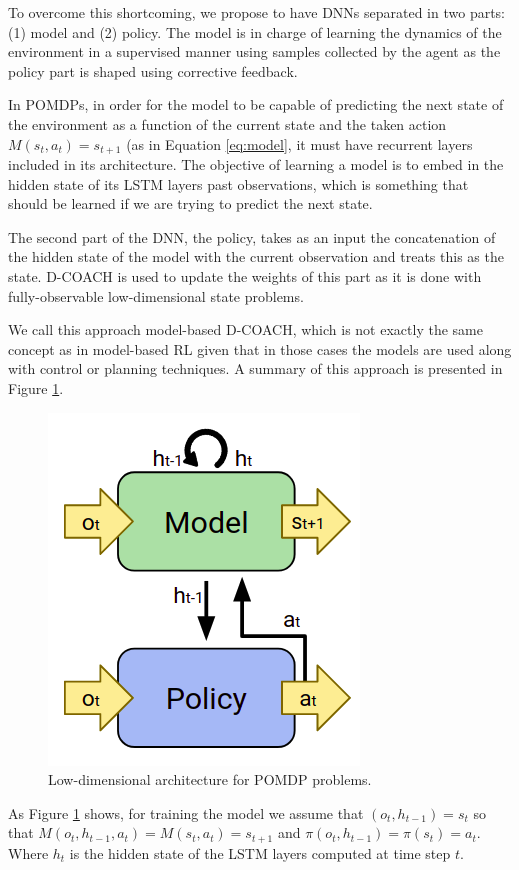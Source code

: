 To overcome this shortcoming, we propose to have DNNs separated in two parts: (1) model and (2) policy. The model is in charge of learning the dynamics of the environment in a supervised manner using samples collected by the agent as the policy part is shaped using corrective feedback. 

In POMDPs, in order for the model to be capable of predicting the next state of the environment as a function of the current state and the taken action $M(s_{t},a_{t}) = s_{t+1}$ (as in Equation \ref{eq:model}, it must have recurrent layers included in its architecture. The objective of learning a model is to embed in the hidden state of its LSTM layers past observations, which is something that should be learned if we are trying to predict the next state. 

The second part of the DNN, the policy, takes as an input the concatenation of the hidden state of the model with the current observation and treats this as the state. D-COACH is used to update the weights of this part as it is done with fully-observable low-dimensional state problems.

We call this approach model-based D-COACH, which is not exactly the same concept as in model-based RL given that in those cases the models are used along with control or planning techniques. A summary of this approach is presented in Figure \ref{fig:mb_dcoach}.

\begin{figure}[h]
    \centering
    \includegraphics[width=0.4\linewidth]{imagenes/cap4/model_based_dcoach.png}
    \caption{Low-dimensional architecture for POMDP problems.}
    \label{fig:mb_dcoach}
\end{figure}

As Figure \ref{fig:mb_dcoach} shows, for training the model we assume that $(o_{t}, h_{t-1}) = s_{t}$ so that $M(o_{t}, h_{t-1},a_{t}) =M(s_{t},a_{t}) = s_{t+1}$ and $\pi(o_{t}, h_{t-1})=\pi(s_{t})=a_{t}$. Where $h_{t}$ is the hidden state of the LSTM layers computed at time step $t$.

